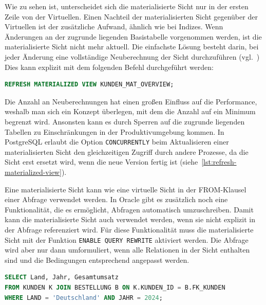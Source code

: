 Wie zu sehen ist, unterscheidet sich die materialisierte Sicht nur in der ersten Zeile von der Virtuellen.
Einen Nachteil der materialisierten Sicht gegenüber der Virtuellen ist der zusätzliche Aufwand, ähnlich wie bei Indizes.
Wenn Änderungen an der zugrunde liegenden Basistabelle vorgenommen werden, ist die materialisierte Sicht nicht mehr aktuell.
Die einfachste Lösung besteht darin, bei jeder Änderung eine vollständige Neuberechnung der Sicht durchzuführen (vgl.\ \cite[S. 608]{silberschatz2011database})
Dies kann explizit mit dem folgenden Befehl durchgeführt werden:

\vspace{-5pt}
\begin{lstlisting}[language=SQL,caption=Aktualisierung der materialisierten Sicht,label={lst:refresh-materialized-view}]
REFRESH MATERIALIZED VIEW KUNDEN_MAT_OVERVIEW;
\end{lstlisting}
\vspace{-5pt}

Die Anzahl an Neuberechnungen hat einen großen Einfluss auf die Performance, weshalb man sich ein Konzept überlegen, mit dem die Anzahl auf ein Minimum begrenzt wird.
Ansonsten kann es durch Sperren auf die zugrunde liegenden Tabellen zu Einschränkungen in der Produktivumgebung kommen.
In PostgreSQL erlaubt die Option \texttt{CONCURRENTLY} beim Aktualisieren einer materialisierten Sicht den gleichzeitigen Zugriff durch andere Prozesse, da die Sicht erst ersetzt wird, wenn die neue Version fertig ist (siehe~\ref{lst:refresh-materialized-view}).

Eine materialisierte Sicht kann wie eine virtuelle Sicht in der FROM-Klausel einer Abfrage verwendet werden.
In Oracle gibt es zusätzlich noch eine Funktionalität, die es ermöglicht, Abfragen automatisch umzuschreiben.
Damit kann die materialisierte Sicht auch verwendet werden, wenn sie nicht explizit in der Abfrage referenziert wird.
Für diese Funktionalität muss die materialisierte Sicht mit der Funktion \texttt{ENABLE QUERY REWRITE} aktiviert werden.
Die Abfrage wird aber nur dann umformuliert, wenn alle Relationen in der Sicht enthalten sind und die Bedingungen entsprechend angepasst werden.

\vspace{-5pt}
\begin{lstlisting}[language=SQL,caption=Select mit View,label={lst:select-with-mat-view}]
SELECT Land, Jahr, Gesamtumsatz
FROM KUNDEN K JOIN BESTELLUNG B ON K.KUNDEN_ID = B.FK_KUNDEN
WHERE LAND = 'Deutschland' AND JAHR = 2024;
\end{lstlisting}
\vspace{-5pt}

